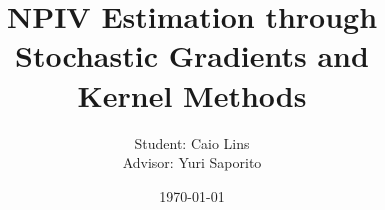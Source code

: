 \usepackage{global-macros}
\usepackage{graphicx}
\graphicspath{{../fig}}
\usepackage{algpseudocode, algorithm}
\usepackage{biblatex}

\vfuzz=30pt




\title{NPIV Estimation through Stochastic Gradients and \\ Kernel Methods}
\author{Student: Caio Lins
        \\ Advisor: Yuri Saporito
}
\date{\today}




\newcommand{\boldf}{\boldsymbol{f}}

\newcommand{\hstar}{h^{ \star }}
\newcommand{\risk}{\mathcal{R}}
\newcommand{\loss}{\ell}
\renewcommand{\hat}{\widehat}
\newcommand{\iid}{\overset{\mathrm{iid}}{\sim}}
\DeclareMathOperator{\diam}{diam}
\newcommand{\data}{\mathcal{D}}
\newcommand{\dataproj}{\mathcal{D}_{ \mathrm{proj} }}
